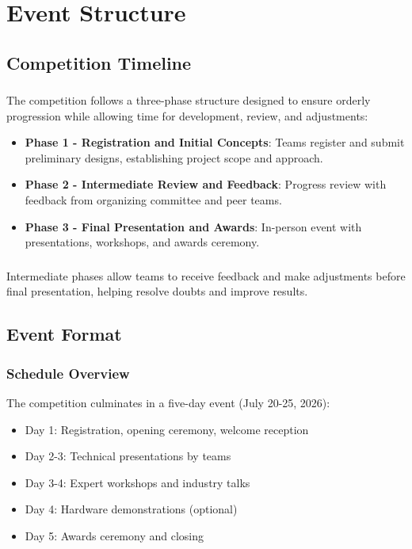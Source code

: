 
\renewcommand{\thesection}{ES}
\section{Event Structure}

\subsection{Competition Timeline}

\subsubsection{}
The competition follows a three-phase structure designed to ensure orderly progression while allowing time for development, review, and adjustments:

\begin{itemize}[noitemsep]
    \item \textbf{Phase 1 - Registration and Initial Concepts}: Teams register and submit preliminary designs, establishing project scope and approach.
    \item \textbf{Phase 2 - Intermediate Review and Feedback}: Progress review with feedback from organizing committee and peer teams.
    \item \textbf{Phase 3 - Final Presentation and Awards}: In-person event with presentations, workshops, and awards ceremony.
\end{itemize}

\subsubsection{}
Intermediate phases allow teams to receive feedback and make adjustments before final presentation, helping resolve doubts and improve results.

\subsection{Event Format}

\subsubsection{Schedule Overview}
The competition culminates in a five-day event (July 20-25, 2026):

\begin{itemize}[noitemsep]
    \item Day 1: Registration, opening ceremony, welcome reception
    \item Day 2-3: Technical presentations by teams
    \item Day 3-4: Expert workshops and industry talks
    \item Day 4: Hardware demonstrations (optional)
    \item Day 5: Awards ceremony and closing
\end{itemize}

